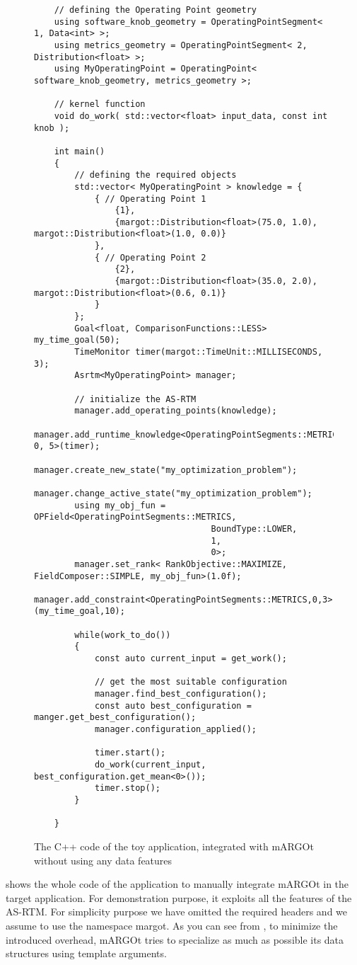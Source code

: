 \begin{figure}[!t]
	\centering
	\lstset{language=MyCPP}
	\begin{lstlisting}
	// defining the Operating Point geometry
	using software_knob_geometry = OperatingPointSegment< 1, Data<int> >;
	using metrics_geometry = OperatingPointSegment< 2, Distribution<float> >;
	using MyOperatingPoint = OperatingPoint< software_knob_geometry, metrics_geometry >;
	
	// kernel function
	void do_work( std::vector<float> input_data, const int knob );
	
	int main()
	{
		// defining the required objects
		std::vector< MyOperatingPoint > knowledge = {
			{ // Operating Point 1
				{1},
				{margot::Distribution<float>(75.0, 1.0), margot::Distribution<float>(1.0, 0.0)}
			},
			{ // Operating Point 2
				{2},
				{margot::Distribution<float>(35.0, 2.0), margot::Distribution<float>(0.6, 0.1)}
			}
		};
		Goal<float, ComparisonFunctions::LESS> my_time_goal(50);
		TimeMonitor timer(margot::TimeUnit::MILLISECONDS, 3);
		Asrtm<MyOperatingPoint> manager;
		
		// initialize the AS-RTM
		manager.add_operating_points(knowledge);
		manager.add_runtime_knowledge<OperatingPointSegments::METRICS, 0, 5>(timer);
		manager.create_new_state("my_optimization_problem");
		manager.change_active_state("my_optimization_problem");
		using my_obj_fun = OPField<OperatingPointSegments::METRICS,
		                           BoundType::LOWER,
		                           1,
		                           0>;
		manager.set_rank< RankObjective::MAXIMIZE, FieldComposer::SIMPLE, my_obj_fun>(1.0f);
		manager.add_constraint<OperatingPointSegments::METRICS,0,3>(my_time_goal,10);
	
		while(work_to_do())
		{
			const auto current_input = get_work();
			
			// get the most suitable configuration
			manager.find_best_configuration();
			const auto best_configuration = manger.get_best_configuration();
			manager.configuration_applied();
			
			timer.start();
			do_work(current_input, best_configuration.get_mean<0>());
			timer.stop();
		}
	
	}
	\end{lstlisting}
	\caption{The C++ code of the toy application, integrated with mARGOt without using any data features}
	\label{fig:toy_application_integration_simple}
\end{figure}

 shows the whole code of the application to manually integrate mARGOt in the target application.
For demonstration purpose, it exploits all the features of the AS-RTM.
For simplicity purpose we have omitted the required headers and we assume to use the namespace margot.
As you can see from , to minimize the introduced overhead, mARGOt tries to specialize as much as possible its data structures using template arguments.
 
